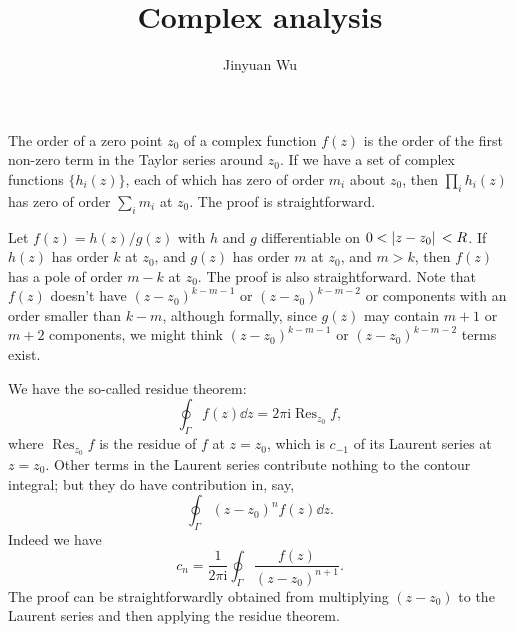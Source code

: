 \documentclass[hyperref, a4paper]{article}
\title{Complex analysis}
\author{Jinyuan Wu}
\DeclareMathOperator{\res}{Res}
\newcommand*{\ii}{\mathrm{i}}
\begin{document}
\maketitle

The order of a zero point $z_0$ of a complex function $f(z)$ 
is the order of the first non-zero term in the Taylor series around $z_0$.
If we have a set of complex functions $\{h_i(z)\}$, 
each of which has zero of order $m_i$ about $z_0$,
then $\prod_i h_i(z)$ has zero of order $\sum_i m_i$ at $z_0$.
The proof is straightforward.

Let $f(z) = h(z) / g(z)$
with $h$ and $g$ differentiable on $0 < \abs*{z - z_0} < R$.
If $h(z)$ has order $k$ at $z_0$,
and $g(z)$ has order $m$ at $z_0$,
and $m > k$,
then $f(z)$ has a pole of order $m - k$ at $z_0$.
The proof is also straightforward.
Note that $f(z)$ doesn't have $(z - z_0)^{k - m - 1}$ or $(z - z_0)^{k - m - 2}$ or 
components with an order smaller than $k - m$,
although formally, since $g(z)$ may contain $m+1$ or $m + 2$ components,
we might think $(z - z_0)^{k - m - 1}$ or $(z - z_0)^{k - m - 2}$ terms exist.

We have the so-called residue theorem:
\begin{equation}
    \oint_{\Gamma} f(z) \dd{z} = 2 \pi \ii \res_{z_0} f,
\end{equation}
where $\res_{z_0} f$ is the residue of $f$ at $z = z_0$,
which is $c_{-1}$ of its Laurent series at $z = z_0$.
Other terms in the Laurent series contribute nothing 
to the contour integral;
but they do have contribution in, say, 
\begin{equation}
    \oint_{\Gamma} (z - z_0)^n f(z) \dd{z}.
\end{equation}
Indeed we have 
\begin{equation}
    c_n = \frac{1}{2\pi \ii} \oint_{\Gamma} \frac{f(z)}{(z - z_0)^{n+1}}.
\end{equation}
The proof can be straightforwardly obtained from 
multiplying $(z - z_0)$ to the Laurent series 
and then applying the residue theorem.
\end{document}
